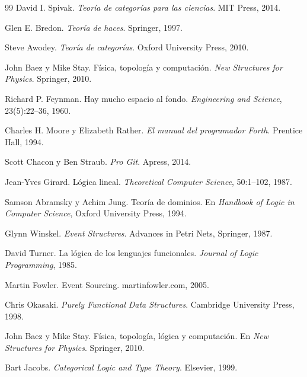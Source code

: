 \documentclass[12pt]{article}
\begin{document}
\begin{thebibliography}{99}
David I. Spivak.
\textit{Teoría de categorías para las ciencias}.
MIT Press, 2014.

Glen E. Bredon.
\textit{Teoría de haces}.
Springer, 1997.

Steve Awodey.
\textit{Teoría de categorías}.
Oxford University Press, 2010.

John Baez y Mike Stay.
Física, topología y computación.
\textit{New Structures for Physics}.
Springer, 2010.

Richard P. Feynman.
Hay mucho espacio al fondo.
\textit{Engineering and Science}, 23(5):22--36, 1960.

Charles H. Moore y Elizabeth Rather.
\textit{El manual del programador Forth}.
Prentice Hall, 1994.

Scott Chacon y Ben Straub.
\textit{Pro Git}.
Apress, 2014.

Jean-Yves Girard.
Lógica lineal.
\textit{Theoretical Computer Science}, 50:1--102, 1987.

Samson Abramsky y Achim Jung.
Teoría de dominios.
En \textit{Handbook of Logic in Computer Science}, Oxford University Press, 1994.

Glynn Winskel.
\textit{Event Structures}.
Advances in Petri Nets, Springer, 1987.

David Turner.
La lógica de los lenguajes funcionales.
\textit{Journal of Logic Programming}, 1985.

Martin Fowler.
Event Sourcing.
martinfowler.com, 2005.

Chris Okasaki.
\textit{Purely Functional Data Structures}.
Cambridge University Press, 1998.

John Baez y Mike Stay.
Física, topología, lógica y computación.
En \textit{New Structures for Physics}.
Springer, 2010.

Bart Jacobs.
\textit{Categorical Logic and Type Theory}.
Elsevier, 1999.

\end{thebibliography}
\end{document}
